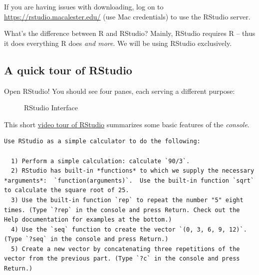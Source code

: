 \documentclass[
  letterpaper,
  DIV=11,
  numbers=noendperiod]{scrreprt}
\begin{document}
If you are having issues with downloading, log on to
\url{https://rstudio.macalester.edu/} (use Mac credentials) to use the
RStudio server.

What's the difference between R and RStudio? Mainly, RStudio requires R
-- thus it does everything R does \emph{and more}. We will be using
RStudio exclusively.

\subsection{A quick tour of RStudio}\label{a-quick-tour-of-rstudio}

Open RStudio! You should see four panes, each serving a different
purpose:

\begin{figure}


\caption{\label{fig-main}RStudio Interface}

\end{figure}%

This short \href{http://www.youtube.com/embed/JfIo2Ua_oqQ/}{video tour
of RStudio} summarizes some basic features of the \emph{console}.

\begin{verbatim}
Use RStudio as a simple calculator to do the following:
  
  1) Perform a simple calculation: calculate `90/3`.
  2) RStudio has built-in *functions* to which we supply the necessary *arguments*:  `function(arguments)`.  Use the built-in function `sqrt` to calculate the square root of 25.
  3) Use the built-in function `rep` to repeat the number "5" eight times. (Type `?rep` in the console and press Return. Check out the Help documentation for examples at the bottom.)
  4) Use the `seq` function to create the vector `(0, 3, 6, 9, 12)`.  (Type `?seq` in the console and press Return.)
  5) Create a new vector by concatenating three repetitions of the vector from the previous part. (Type `?c` in the console and press Return.)
\end{verbatim}
\end{document}
